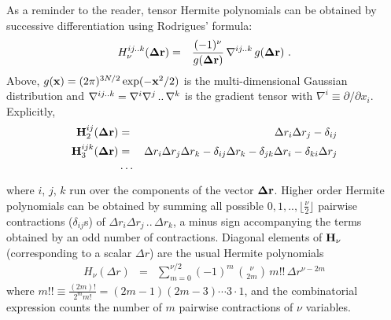 \documentclass[prl,nofootinbib,twocolumn,floatfix,showpacs]{revtex4}
\begin{document}
As a reminder to the reader, tensor Hermite polynomials can be
obtained by successive differentiation using Rodrigues' formula:
\begin{eqnarray}
\label{Rodrigues}
H_{\nu}^{ij..k}({\bf \Delta r}) &=& \frac{(-1)^\nu}{g({\bf
    \Delta r})}\,{\bf\nabla}^{ij..k}\,g({\bf \Delta r})\ .
\end{eqnarray}
Above, $g({\bf x}) = (2\pi)^{3N/2}\exp(-{\bf x}^2/2)$ is the
multi-dimen{\-}sional Gaussian distribution and ${\bf \nabla}^{ij..k} =
\nabla^i\nabla^j\,..\,\nabla^k$ is the gradient tensor with
$\nabla^i \equiv \partial/\partial x_i$. Explicitly,
\begin{eqnarray}
{\bf H}^{ij}_2({\bf \Delta r}) &=& \Delta r_i\Delta r_j - \delta_{ij} \nonumber \\
{\bf H}^{ijk}_3({\bf \Delta r}) &=& \Delta r_i\Delta r_j\Delta r_k - \delta_{ij}\Delta r_k- \delta_{jk}\Delta r_i- \delta_{ki}\Delta r_j \nonumber \\
& \cdots &
\end{eqnarray}
where $i$, $j$, $k$ run over the components of the vector ${\bf\Delta
  r}$. Higher order Hermite polynomials can be obtained by summing all
possible $0,1,.., \lfloor\frac{\nu}{2}\rfloor$ pairwise
contractions ($\delta_{ij}$s)  of $\Delta r_i\Delta r_j\,..\,\Delta r_k$, a minus sign
accompanying the terms obtained by an odd number of
contractions. Diagonal elements of ${\bf H}_\nu$ (corresponding to a
scalar $\Delta r$) are the usual Hermite polynomials
\begin{eqnarray}
H_\nu(\Delta r) &=& \sum_{m=0}^{\nu/2} (-1)^m\, {\nu \choose 2m} \,m!!\,\Delta r^{\nu-2m}
\label{hermite_anal}
\end{eqnarray}
where $m!!\equiv \frac{(2m)!}{2^m m!} = (2m-1)(2m-3)\cdots 3\cdot
1$, and the combinatorial expression counts the number of $m$ pairwise
contractions of $\nu$ variables.
\end{document}
